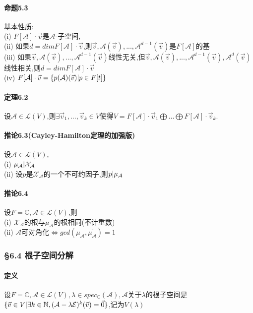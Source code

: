 \documentclass{ctexart}
\begin{document}
\paragraph{命题5.3}
基本性质:\\
(i) $F[\mathcal{A}]\cdot \vec{v}$是$\mathcal{A}$-子空间,\\
(ii) 如果$d=dimF[\mathcal{A}]\cdot \vec{v}$,则$\vec{v},\mathcal{A}(\vec{v}),...,\mathcal{A}^{d-1}(\vec{v})$是$F[\mathcal{A}]$的基\\
(iii) 如果$\vec{v},\mathcal{A}(\vec{v}),...,\mathcal{A}^{d-1}(\vec{v})$线性无关,但$\vec{v},\mathcal{A}(\vec{v}),...,\mathcal{A}^{d-1}(\vec{v}),\mathcal{A}^{d}(\vec{v})$线性相关,则$d=dimF[\mathcal{A}]\cdot \vec{v}$\\
(iv) $F[\mathcal{A}]\cdot \vec{v} = \{ p(\mathcal{A})(\vec{v})\arrowvert p \in F[t] \}$

\paragraph{定理6.2}
设$\mathcal{A} \in \mathcal{L}(V)$,则$\exists \vec{v}_{1},...,\vec{v}_{k} \in V$使得$V=F[\mathcal{A}]\cdot \vec{v}_{1} \bigoplus ... \bigoplus F[\mathcal{A}] \cdot \vec{v}_{k}$.

\paragraph{推论6.3(Cayley-Hamilton定理的加强版)}
设$\mathcal{A} \in \mathcal{L}(V)$,\\
(i) $\mu_{\mathcal{A}} \arrowvert \mathcal{X}_{\mathcal{A}}$\\
(ii) 设$p$是$\mathcal{X}_{\mathcal{A}}$的一个不可约因子,则$p\arrowvert \mu_{\mathcal{A}}$

\paragraph{推论6.4}
设$F=\mathbb{C},\mathcal{A} \in \mathcal{L}(V)$,则\\
(i) $\mathcal{X}_{\mathcal{A}}$的根与$\mu_{\mathcal{A}}$的根相同(不计重数)\\
(ii) $\mathcal{A}$可对角化$\Leftrightarrow gcd(\mu_{\mathcal{A}},\mu^{'}_{\mathcal{A}}) = 1$

\subsubsection{§6.4 根子空间分解}

\paragraph{定义}
设$F=\mathbb{C},\mathcal{A} \in \mathcal{L}(V),\lambda \in spec_{\mathbb{C}}(\mathcal{A}),\mathcal{A}$关于$\lambda$的根子空间是$\{ \vec{v} \in V \arrowvert \exists k \in \mathbb{N} , (\mathcal{A}-\lambda \mathcal{E})^{k}(\vec{v}) = \vec{0} \}$,记为$V(\lambda)$
\end{document}
